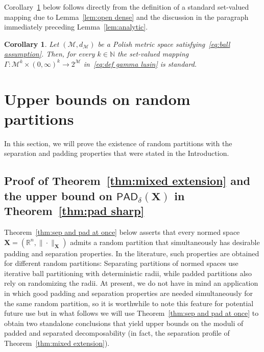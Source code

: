 \documentclass[11pt,reqno]{amsart}
\renewcommand{\d}{\delta}
\newcommand{\X}{\mathbf X}
\newcommand{\R}{\mathbb R}
\newtheorem{corollary}[theorem]{Corollary}
\theoremstyle{remark}
\newcommand{\MM}{\mathcal{M}}
\newcommand{\N}{\mathbb N}
\renewcommand{\1}{\mathbf 1}
\newcommand{\pad}{\mathsf{PAD}}
\begin{document}
Corollary~\ref{coro:standard} below follows directly from the definition of  a standard set-valued mapping due to Lemma~\ref{lem:open dense} and the discussion in the paragraph immediately preceding Lemma~\ref{lem:analytic}.




\begin{corollary}\label{coro:standard} Let $(\MM,d_\MM)$ be   a Polish metric space satisfying~\eqref{eq:ball assumption}. Then, for every $k\in \N$ the set-valued mapping $\Gamma:{\MM}^k\times (0,\infty)^k\to 2^{\MM}$ in~\eqref{eq:def gamma lusin} is  standard.
\end{corollary}


\section{Upper bounds on random partitions}\label{sec:upper}

In this section, we will prove the existence of random partitions with the separation and padding properties that were stated in the Introduction.


\subsection{Proof of Theorem~\ref{thm:mixed extension} and the upper bound on $\pad_\d(\X)$ in Theorem~\ref{thm:pad sharp}}\label{sec:the partition} Theorem~\ref{thm:sep and pad at once} below asserts that every normed space $\X=(\R^n,\|\cdot\|_{\X})$ admits a random partition that simultaneously has desirable padding and separation properties. In the literature, such properties are obtained for different random partitions: Separating partitions of normed spaces use iterative ball partitioning with deterministic radii, while padded partitions also rely on randomizing the radii. At present, we do not have in mind an application in which good padding and separation properties are needed simultaneously for the same random partition, so it is worthwhile to note this feature for potential future use but in what follows we will use Theorem~\ref{thm:sep and pad at once} to obtain two standalone conclusions that yield upper bounds on the moduli of  padded and separated decomposability (in fact, the separation profile of Theorem~\ref{thm:mixed extension}).
\end{document}
